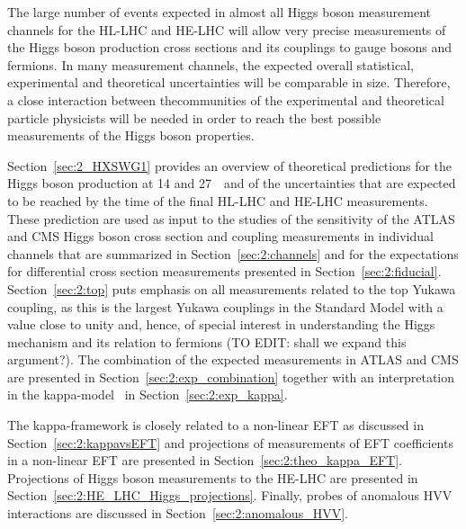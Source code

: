 The large number of events expected in almost all Higgs boson measurement channels for the HL-LHC and HE-LHC will allow very precise measurements of the Higgs boson production cross sections and its couplings to gauge bosons and fermions. In many measurement channels, the expected overall statistical, experimental and theoretical uncertainties will be comparable in size. Therefore, a close interaction between thecommunities of the experimental and theoretical particle physicists will be needed in order to reach the best possible measurements of the Higgs boson properties.

Section~\ref{sec:2_HXSWG1} provides an overview of theoretical predictions for the Higgs boson production at 14 and 27~\UTeV\ and of the uncertainties that are expected to be reached by the time of the final HL-LHC and HE-LHC measurements. 
These prediction are used as input to the studies of the sensitivity of the ATLAS and CMS Higgs boson cross section and coupling measurements in individual channels that are summarized in Section~\ref{sec:2:channels} and for the expectations for differential cross section measurements presented in Section~\ref{sec:2:fiducial}.
Section~\ref{sec:2:top} puts emphasis on all measurements related to the top Yukawa coupling, as this is the largest Yukawa couplings in the Standard Model with a value close to unity and, hence, of special interest in understanding the Higgs mechanism and its relation to fermions (TO EDIT: shall we expand this argument?).
The combination of the expected measurements in ATLAS and CMS are presented in Section~\ref{sec:2:exp_combination} together with an interpretation in the kappa-model~\cite{LHCHiggsCrossSectionWorkingGroup:2012nn,Heinemeyer:2013tqa} in Section~\ref{sec:2:exp_kappa}.

The kappa-framework is closely related to a non-linear EFT as discussed in Section~\ref{sec:2:kappavsEFT} and projections of measurements of EFT coefficients in a non-linear EFT are presented in Section~\ref{sec:2:theo_kappa_EFT}. Projections of Higgs boson measurements to the HE-LHC are presented in Section~\ref{sec:2:HE_LHC_Higgs_projections}. Finally, probes of anomalous HVV interactions are discussed in Section~\ref{sec:2:anomalous_HVV}.
